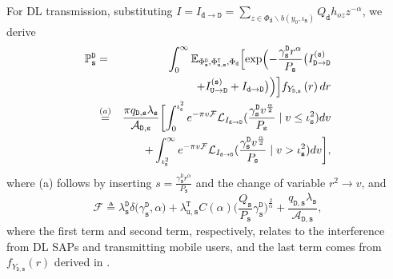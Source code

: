 \documentclass[twocolumn,english]{IEEEtran}
\theoremstyle{plain}
\theoremstyle{definition}
\begin{document}
For DL transmission, substituting $I=I_{\mathtt{d\rightarrow D}}=\sum_{z\in\Phi_{\mathtt{d}}\backslash b\left(y_{0},\iota_{\mathtt{s}}\right)}Q_{\mathtt{d}}h_{oz}z^{-\alpha}$,
we derive
\begin{eqnarray*}
\mathbb{P}_{\mathtt{s}}^{\mathtt{D}} & = & \int_{0}^{\infty}\mathbb{E}_{\Phi_{\mathtt{s}}^{\mathtt{D}},\Phi_{\mathtt{u},\mathtt{s}}^{\mathtt{T}},\Phi_{\mathtt{d}}}\Bigl[\exp\Bigl(-\frac{\gamma_{\mathtt{s}}^{\mathtt{D}}r^{\alpha}}{P_{\mathtt{s}}}\bigl(I_{\mathtt{D\rightarrow D}}^{\mathtt{(s)}}\\
 &  & +I_{\mathtt{U\rightarrow D}}^{\mathtt{(s)}}+I_{\mathtt{d\rightarrow D}}\bigr)\Bigr)\Bigr]f_{Y_{\mathtt{D,s}}}\left(r\right)dr\\
 & \overset{(a)}{=} & \frac{\pi q_{\mathtt{D,s}}\lambda_{\mathtt{s}}}{\mathcal{A}_{\mathtt{D,s}}}\biggl[\int_{0}^{\iota_{\mathtt{s}}^{2}}e^{-\pi v\mathcal{F}}\mathcal{L}_{I_{\mathtt{d\rightarrow D}}}(\frac{\gamma_{\mathtt{s}}^{\mathtt{D}}v^{\frac{\alpha}{2}}}{P_{\mathtt{s}}}\mid v\leq\iota_{\mathtt{s}}^{2})dv\\
 &  & +\int_{\iota_{\mathtt{s}}^{2}}^{\infty}e^{-\pi v\mathcal{F}}\mathcal{L}_{I_{\mathtt{d\rightarrow D}}}(\frac{\gamma_{\mathtt{s}}^{\mathtt{D}}v^{\frac{\alpha}{2}}}{P_{\mathtt{s}}}\mid v>\iota_{\mathtt{s}}^{2})dv\biggr],
\end{eqnarray*}
where (a) follows by inserting $s=\frac{\gamma_{\mathtt{s}}^{\mathtt{D}}r^{\alpha}}{P_{\mathtt{s}}}$
and the change of variable $r^{2}\rightarrow v$, and
\begin{equation}
\mathcal{F\triangleq}\lambda_{\mathtt{s}}^{\mathtt{D}}\delta\bigl(\gamma_{\mathtt{s}}^{\mathtt{D}},\alpha\bigr)+\lambda_{\mathtt{u,s}}^{\mathtt{T}}C\left(\alpha\right)\bigl(\frac{Q_{\mathtt{s}}}{P_{\mathtt{s}}}\gamma_{\mathtt{s}}^{\mathtt{D}}\bigr)^{\frac{2}{\alpha}}+\frac{q_{\mathtt{D,s}}\lambda_{\mathtt{s}}}{\mathcal{A}_{\mathtt{D,s}}},\label{eq:F}
\end{equation}
where the first term and second term, respectively, relates to the
interference from DL SAPs and transmitting mobile users, and the last
term comes from $f_{Y_{\mathtt{D,s}}}\left(r\right)$ derived in .
\end{document}
